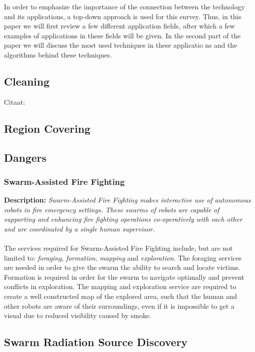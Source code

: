 \documentclass[a4paper]{article}
\begin{document}
In order to emphasize the importance of the connection between the technology and its applications, a top-down approach is used for this survey. Thus,  in this paper we will first review a few different application fields, after which a few examples of applications in these fields will be given. In the second part of the paper we will discuss the most used techniques in these applicatio ns and the algorithms behind these techniques. \\

  \subsection{Cleaning}
  Citaat: \cite{wagner2008cooperative} \cite{altshuler2005swarm}
  
  \subsection{Region Covering}
  \subsection{Dangers}
  \subsubsection{Swarm-Assisted Fire Fighting}
  \textbf{Description: }\emph{Swarm-Assisted Fire Fighting makes interactive use of autonomous robots in fire emergency settings. These swarms of robots are capable of supporting and enhancing fire fighting operations co-operatively with each other and are coordinated by a single human supervisor.}\cite{Naghsh2008,Penders2011}\\\\
  The services required for Swarm-Assisted Fire Fighting include, but are not limited to: \emph{foraging}, \emph{formation}, \emph{mapping} and \emph{exploration}.\cite{Naghsh2008,Penders2011} The foraging services are needed in order to give the swarm the ability to search and locate victims. Formation is required in order for the swarm to navigate optimally and prevent conflicts in exploration. The mapping and exploration service are required to create a well constructed map of the explored area, such that the human and other robots are aware of their surroundings, even if it is impossible to get a visual due to reduced visibility caused by smoke.

  \subsection{Swarm Radiation Source Discovery}
\end{document}
